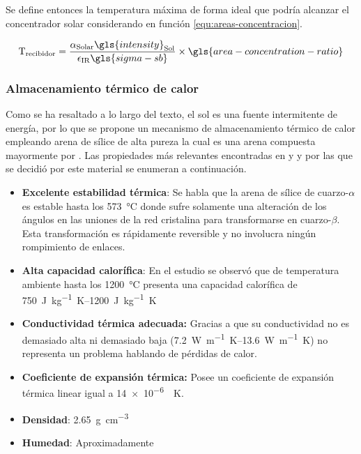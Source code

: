 				Se define entonces la temperatura máxima de forma ideal que podría alcanzar el concentrador solar considerando en función \cref{equ:areas-concentracion}.
				
				\begin{equation}
					\text{T}_{\text{recibidor}} = \dfrac{\alpha_{\text{Solar}} \gls{intensity}_{\text{Sol}}}{\epsilon_{\text{IR}} \gls{sigma-sb}} \times \gls{area-concentration-ratio}
				\end{equation}
				
				
				
				
			\subsubsection{Almacenamiento térmico de calor}
				
				Como se ha resaltado a lo largo del texto, el sol es una fuente intermitente de energía, por lo que se propone un mecanismo de almacenamiento térmico de calor empleando arena de sílice de alta pureza la cual es una arena compuesta mayormente por . Las propiedades más relevantes encontradas en \cite{davenport_thermal_2022} y \cite{wypych_2_2021} y por las que se decidió por este material se enumeran a continuación.
				
				\begin{itemize}
					\item \textbf{Excelente estabilidad térmica}: Se habla que la arena de sílice de cuarzo-$\alpha$ es estable hasta los \qty{573}{\degreeCelsius} donde sufre solamente una alteración de los ángulos en las uniones de la red cristalina para transformarse en cuarzo-$\beta$. Esta transformación es rápidamente reversible y no involucra ningún rompimiento de enlaces.
					\item \textbf{Alta capacidad calorífica}: En el estudio se observó que de temperatura ambiente hasta los \qty{1200}{\degreeCelsius} presenta una capacidad calorífica de \qtyrange{750}{1200}{\joule\per\kg\kelvin}
					\item \textbf{Conductividad térmica adecuada:} Gracias a que su conductividad no es demasiado alta ni demasiado baja (\qtyrange{7.2}{13.6}{\watt\per\m\kelvin}) no representa un problema hablando de pérdidas de calor.
					\item \textbf{Coeficiente de expansión térmica:} Posee un coeficiente de expansión térmica linear igual a \qty{14e-6}{\per\kelvin}.
					\item \textbf{Densidad}: \qty{2.65}{\g\per\cm\tothe{3}}
					\item \textbf{Humedad}: Aproximadamente 
				\end{itemize}
				
